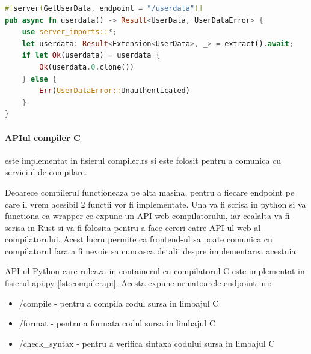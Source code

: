 \documentclass[titlepage,12pt]{article}
\DeclareRobustCommand{\code}[1]{{\ttfamily\small #1}}
\begin{document}
\begin{lstlisting}[language=Rust,caption={API pentru obtinerea datelor despre utilizatorul autentificat},label={lst:userdataapi}]
#[server(GetUserData, endpoint = "/userdata")]
pub async fn userdata() -> Result<UserData, UserDataError> {
    use server_imports::*;
    let userdata: Result<Extension<UserData>, _> = extract().await;
    if let Ok(userdata) = userdata {
        Ok(userdata.0.clone())
    } else {
        Err(UserDataError::Unauthenticated)
    }
}
\end{lstlisting}

\paragraph{API\-ul compiler C} este implementat in fisierul \code{compiler.rs} si este folosit pentru a comunica cu serviciul de compilare.

Deoarece compilerul functioneaza pe alta masina, pentru a fiecare endpoint pe care il vrem acesibil 2 functii vor fi implementate. Una va fi scrisa in python si va functiona ca wrapper ce expune un API web compilatorului, iar cealalta va fi scrisa in Rust si va fi folosita pentru a face cereri catre API-ul web al compilatorului. Acest lucru permite ca frontend-ul sa poate comunica cu compilatorul fara a fi nevoie sa cunoasca detalii despre implementarea acestuia.

API-ul Python care ruleaza in containerul cu compilatorul C este implementat in fisierul \code{api.py} \cref{lst:compilerapi}. Acesta expune urmatoarele endpoint-uri:
\begin{itemize}
    \item \code{/compile} - pentru a compila codul sursa in limbajul C
    \item \code{/format} - pentru a formata codul sursa in limbajul C
    \item \code{/check\_syntax} - pentru a verifica sintaxa codului sursa in limbajul C
\end{itemize}
\end{document}
